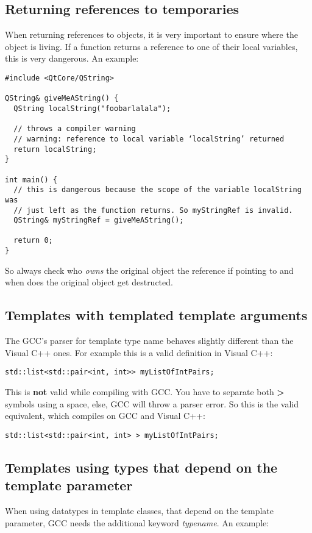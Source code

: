 \subsection{Returning references to temporaries} When returning references to objects, it is very important to ensure where the object is living. If a function returns a reference to one of their local variables, this is very dangerous. An example:
\begin{verbatim}
#include <QtCore/QString>

QString& giveMeAString() {
  QString localString("foobarlalala");

  // throws a compiler warning
  // warning: reference to local variable ‘localString’ returned
  return localString;
}

int main() {
  // this is dangerous because the scope of the variable localString was 
  // just left as the function returns. So myStringRef is invalid.
  QString& myStringRef = giveMeAString();

  return 0;
}
\end{verbatim}
So always check who \emph{owns} the original object the reference if pointing to and when does the original object get destructed.


\subsection{Templates with templated template arguments} The GCC's parser for template type name behaves slightly different than the Visual C++ ones. For example this is a valid definition in Visual C++: 
\begin{verbatim}
std::list<std::pair<int, int>> myListOfIntPairs; 
\end{verbatim}

This is \textbf{not} valid while compiling with GCC. You have to separate both \textbf{>} symbols using a space, else, GCC will throw a parser error. So this is the valid equivalent, which compiles on GCC and Visual C++: 
\begin{verbatim}
std::list<std::pair<int, int> > myListOfIntPairs; 
\end{verbatim}

\subsection{Templates using types that depend on the template parameter} When using datatypes in template classes, that depend on the template parameter, GCC needs the additional keyword \emph{typename}. An example:

